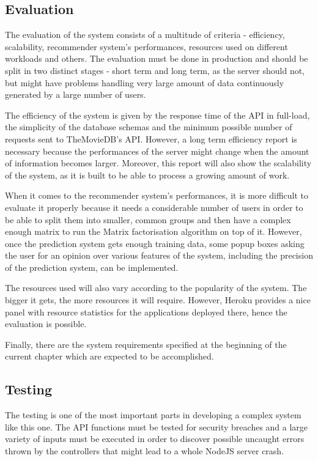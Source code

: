 \subsection{Evaluation}

The evaluation of the system consists of a multitude of criteria - efficiency, scalability, recommender system's performances, resources used on different workloads and others. The evaluation must be done in production and should be split in two distinct stages - short term and long term, as the server should not, but might have problems handling very large amount of data continuously generated by a large number of users.

The efficiency of the system is given by the response time of the API in full-load, the simplicity of the database schemas and the minimum possible number of requests sent to TheMovieDB's API. However, a long term efficiency report is necessary because the performances of the server might change when the amount of information becomes larger. Moreover, this report will also show the scalability of the system, as it is built to be able to process a growing amount of work.

When it comes to the recommender system's performances, it is more difficult to evaluate it properly because it needs a considerable number of users in order to be able to split them into smaller, common groups and then have a complex enough matrix to run the Matrix factorisation algorithm on top of it. However, once the prediction system gets enough training data, some popup boxes asking the user for an opinion over various features of the system, including the precision of the prediction system, can be implemented.

The resources used will also vary according to the popularity of the system. The bigger it gets, the more resources it will require. However, Heroku \cite{heroku} provides a nice panel with resource statistics for the applications deployed there, hence the evaluation is possible.

Finally, there are the system requirements specified at the beginning of the current chapter which are expected to be accomplished.

\subsection{Testing}

The testing is one of the most important parts in developing a complex system like this one. The API functions must be tested for security breaches and a large variety of inputs must be executed in order to discover possible uncaught errors thrown by the controllers that might lead to a whole NodeJS server crash.

